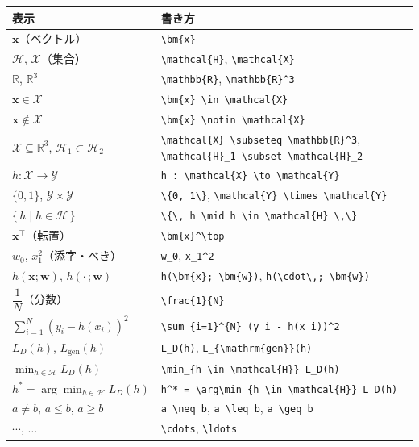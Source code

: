 \documentclass[a4paper,dvipdfmx]{jsarticle}
\newcommand{\学籍番号}{0000000}
\newcommand{\氏名}{氏名を書く}
\newcommand{\提出日}{2026年10月1日}
\begin{document}
\begin{center}
\small
\begin{tabular}{l|l}
\hline
表示 & 書き方 \\
\hline\hline
$\bm{x}$（ベクトル） & \verb|\bm{x}| \\
$\mathcal{H}$, $\mathcal{X}$（集合） & \verb|\mathcal{H}|, \verb|\mathcal{X}| \\
$\mathbb{R}$, $\mathbb{R}^3$ & \verb|\mathbb{R}|, \verb|\mathbb{R}^3| \\
$\bm{x} \in \mathcal{X}$ & \verb|\bm{x} \in \mathcal{X}| \\
$\bm{x} \notin \mathcal{X}$ & \verb|\bm{x} \notin \mathcal{X}| \\
$\mathcal{X} \subseteq \mathbb{R}^3$, $\mathcal{H}_1 \subset \mathcal{H}_2$ & \verb|\mathcal{X} \subseteq \mathbb{R}^3|, \verb|\mathcal{H}_1 \subset \mathcal{H}_2| \\
$h : \mathcal{X} \to \mathcal{Y}$ & \verb|h : \mathcal{X} \to \mathcal{Y}| \\
$\{0, 1\}$, $\mathcal{Y} \times \mathcal{Y}$ & \verb|\{0, 1\}|, \verb|\mathcal{Y} \times \mathcal{Y}| \\
$\{\, h \mid h \in \mathcal{H} \,\}$ & \verb|\{\, h \mid h \in \mathcal{H} \,\}| \\
$\bm{x}^\top$（転置） & \verb|\bm{x}^\top| \\
$w_0$, $x_1^2$（添字・べき） & \verb|w_0|, \verb|x_1^2| \\
$h(\bm{x}; \bm{w})$, $h(\cdot\,; \bm{w})$ & \verb|h(\bm{x}; \bm{w})|, \verb|h(\cdot\,; \bm{w})| \\
$\dfrac{1}{N}$（分数） & \verb|\frac{1}{N}| \\
$\displaystyle\sum_{i=1}^{N} (y_i - h(x_i))^2$ & \verb|\sum_{i=1}^{N} (y_i - h(x_i))^2| \\
$L_D(h)$, $L_{\mathrm{gen}}(h)$ & \verb|L_D(h)|, \verb|L_{\mathrm{gen}}(h)| \\
$\displaystyle\min_{h \in \mathcal{H}} L_D(h)$ & \verb|\min_{h \in \mathcal{H}} L_D(h)| \\
$\displaystyle h^* = \arg\min_{h \in \mathcal{H}} L_D(h)$ & \verb|h^* = \arg\min_{h \in \mathcal{H}} L_D(h)| \\
$a \neq b$, $a \leq b$, $a \geq b$ & \verb|a \neq b|, \verb|a \leq b|, \verb|a \geq b| \\
$\cdots$, $\ldots$ & \verb|\cdots|, \verb|\ldots| \\
\hline
\end{tabular}
\end{center}
\end{document}
